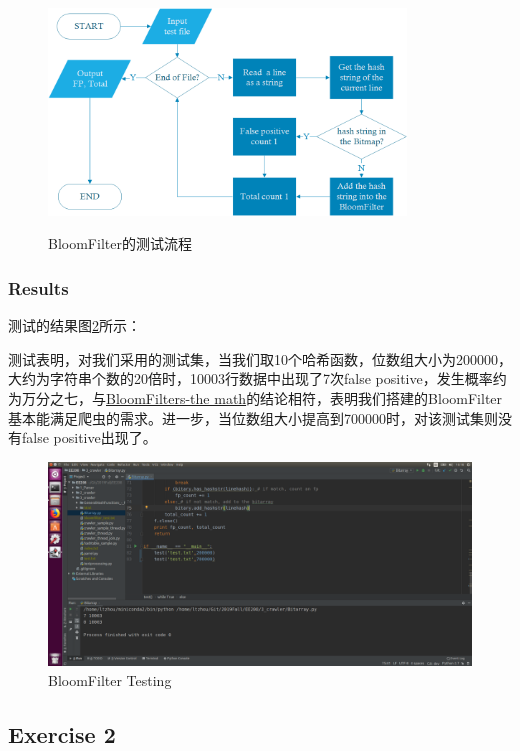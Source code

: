 \documentclass{article}
\begin{document}
\begin{figure}[htbp]
\centering
\includegraphics[width=9.5cm]{img/flowchart.png}
\label{fig:flowchart}
\caption{BloomFilter的测试流程}
\end{figure}

\subsubsection{Results}
测试的结果图\ref{img:1}所示：


测试表明，对我们采用的测试集，当我们取10个哈希函数，位数组大小为200000，大约为字符串个数的20倍时，10003行数据中出现了7次false positive，发生概率约为万分之七，与\href{http://pages.cs.wisc.edu/~cao/papers/summary-cache/node8.html}{BloomFilters-the math}的结论相符，表明我们搭建的BloomFilter基本能满足爬虫的需求。进一步，当位数组大小提高到700000时，对该测试集则没有false positive出现了。

\begin{figure}[htbp]
\centering
\includegraphics[width=13.5cm]{img/test1.png}
\caption{BloomFilter Testing}
\label{img:1}
\end{figure}

\subsection{Exercise 2}
\end{document}
